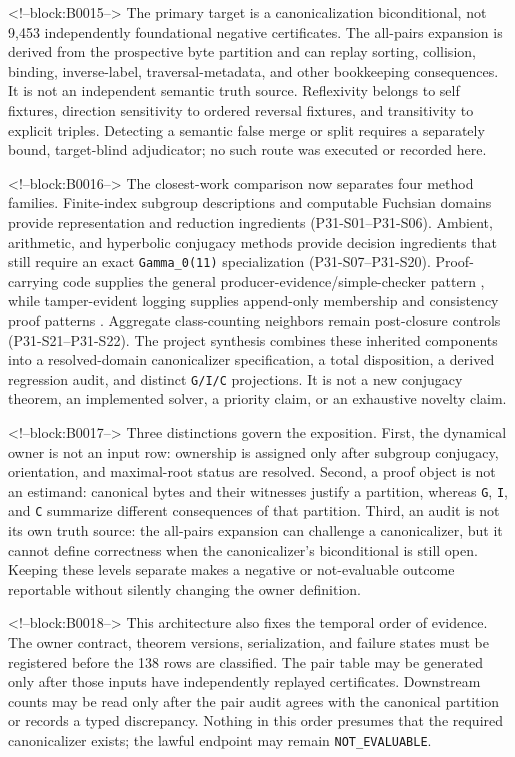\documentclass[11pt]{article}
\begin{document}
<!--block:B0015-->
The primary target is a canonicalization biconditional, not 9,453 independently
foundational negative certificates.  The all-pairs expansion is derived from the
prospective byte partition and can replay sorting, collision, binding,
inverse-label, traversal-metadata, and other bookkeeping consequences.  It is not
an independent semantic truth source.  Reflexivity belongs to self fixtures,
direction sensitivity to ordered reversal fixtures, and transitivity to explicit
triples.  Detecting a semantic false merge or split requires a separately bound,
target-blind adjudicator; no such route was executed or recorded here.

<!--block:B0016-->
The closest-work comparison now separates four method families.  Finite-index
subgroup descriptions and computable Fuchsian domains provide representation and
reduction ingredients (P31-S01--P31-S06).  Ambient, arithmetic, and hyperbolic
conjugacy methods provide decision ingredients that still require an exact
\texttt{Gamma\_0(11)} specialization (P31-S07--P31-S20).  Proof-carrying code
supplies the general producer-evidence/simple-checker pattern \citep{P31-S23},
while tamper-evident logging supplies append-only membership and consistency
proof patterns \citep{P31-S24}.  Aggregate class-counting neighbors remain
post-closure controls (P31-S21--P31-S22).  The project synthesis combines these
inherited components into a resolved-domain canonicalizer specification, a total
disposition, a derived regression audit, and distinct \texttt{G/I/C}
projections.  It is not a new conjugacy theorem, an implemented solver, a
priority claim, or an exhaustive novelty claim.

<!--block:B0017-->
Three distinctions govern the exposition. First, the dynamical owner is
not an input row: ownership is assigned only after subgroup conjugacy,
orientation, and maximal-root status are resolved. Second, a proof
object is not an estimand: canonical bytes and their witnesses justify a
partition, whereas \texttt{G}, \texttt{I}, and \texttt{C} summarize
different consequences of that partition. Third, an audit is not its
own truth source: the all-pairs expansion can challenge a canonicalizer,
but it cannot define correctness when the canonicalizer's biconditional
is still open. Keeping these levels separate makes a negative or
not-evaluable outcome reportable without silently changing the owner
definition.

<!--block:B0018-->
This architecture also fixes the temporal order of evidence. The owner
contract, theorem versions, serialization, and failure states must be
registered before the 138 rows are classified. The pair table may be
generated only after those inputs have independently replayed
certificates. Downstream counts may be read only after the pair audit
agrees with the canonical partition or records a typed discrepancy.
Nothing in this order presumes that the required canonicalizer exists;
the lawful endpoint may remain \texttt{NOT\_EVALUABLE}.
\end{document}
